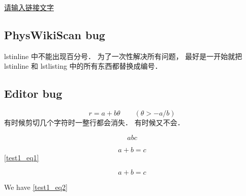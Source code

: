 

\href{http://www.example.com}{请输入链接文字}

\subsection{PhysWikiScan bug}
lstinline 中不能出现百分号． 为了一次性解决所有问题， 最好是一开始就把 lstinline 和 lstlisting 中的所有东西都替换成编号．

\subsection{Editor bug}
\begin{equation}
r = a + b\theta \qquad (\theta > -a/b)
\end{equation}
有时候剪切几个字符时一整行都会消失． 有时候又不会．

\begin{equation}
abc
\end{equation}

\begin{equation}\label{test1_eq1}
a + b = c
\end{equation}
\autoref{test1_eq1}

\begin{equation}\label{test1_eq2}
a + b = c
\end{equation}

We have \autoref{test1_eq2}
